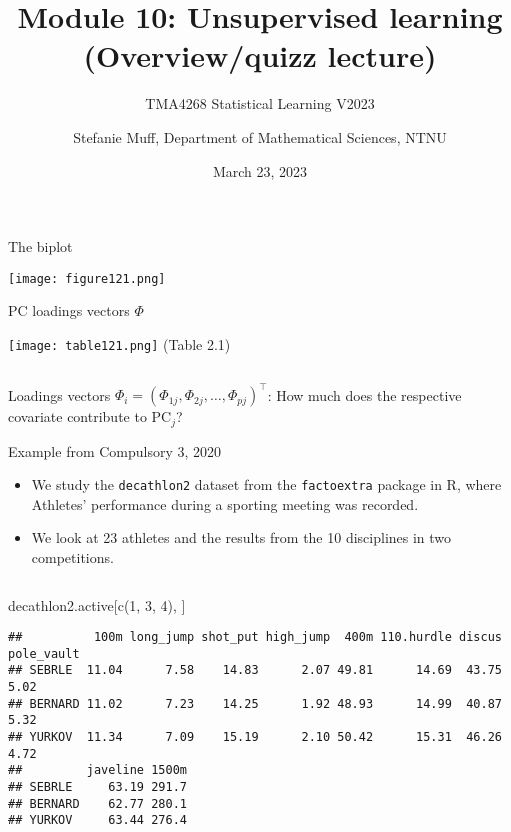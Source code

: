 \documentclass[
  10pt,
  ignorenonframetext,
]{beamer}
\title{Module 10: Unsupervised learning (Overview/quizz lecture)}
\subtitle{TMA4268 Statistical Learning V2023}
\author{Stefanie Muff, Department of Mathematical Sciences, NTNU}
\date{March 23, 2023}
\newenvironment{Shaded}{\begin{snugshade}}{\end{snugshade}}
\newcommand{\DecValTok}[1]{\textcolor[rgb]{0.00,0.00,0.81}{#1}}
\newcommand{\FunctionTok}[1]{\textcolor[rgb]{0.00,0.00,0.00}{#1}}
\newcommand{\NormalTok}[1]{#1}
\begin{document}
\frame{\titlepage}

\begin{frame}
\begin{block}{The biplot}
\protect\hypertarget{the-biplot}{}
\(~\)

\centering

\texttt{[image: figure121.png]}
\end{block}
\end{frame}

\begin{frame}
\begin{block}{PC loadings vectors \(\Phi\)}
\protect\hypertarget{pc-loadings-vectors-phi}{}
\(~\)

\centering

\texttt{[image: table121.png]}
\flushleft (Table 2.1)

\(~\)

Loadings vectors
\(\Phi_i=(\Phi_{1j} , \Phi_{2j},\ldots, \Phi_{pj})^\top\): How much does
the respective covariate contribute to PC\(_j\)?
\end{block}
\end{frame}

\begin{frame}[fragile]
\begin{block}{Example from Compulsory 3, 2020}
\protect\hypertarget{example-from-compulsory-3-2020}{}
\(~\)

\begin{itemize}
\item
  We study the \texttt{decathlon2} dataset from the \texttt{factoextra}
  package in R, where Athletes' performance during a sporting meeting
  was recorded.
\item
  We look at 23 athletes and the results from the 10 disciplines in two
  competitions.
\end{itemize}

\(~\)

\scriptsize

\begin{Shaded}
\begin{Highlighting}[]
\NormalTok{decathlon2.active[}\FunctionTok{c}\NormalTok{(}\DecValTok{1}\NormalTok{, }\DecValTok{3}\NormalTok{, }\DecValTok{4}\NormalTok{), ]}
\end{Highlighting}
\end{Shaded}

\begin{verbatim}
##          100m long_jump shot_put high_jump  400m 110.hurdle discus pole_vault
## SEBRLE  11.04      7.58    14.83      2.07 49.81      14.69  43.75       5.02
## BERNARD 11.02      7.23    14.25      1.92 48.93      14.99  40.87       5.32
## YURKOV  11.34      7.09    15.19      2.10 50.42      15.31  46.26       4.72
##         javeline 1500m
## SEBRLE     63.19 291.7
## BERNARD    62.77 280.1
## YURKOV     63.44 276.4
\end{verbatim}
\end{block}
\end{frame}
\end{document}
